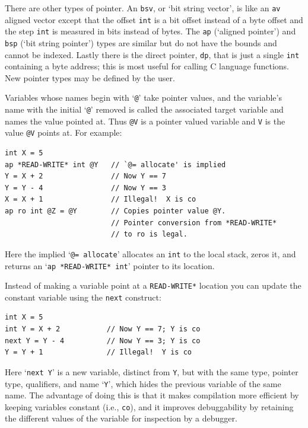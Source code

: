 \documentclass[12pt]{article}
\newenvironment{indpar}[1][0.3in]%
	{\begin{list}{}%
		     {\setlength{\itemsep}{0in}%
		      \setlength{\topsep}{0in}%
		      \setlength{\parsep}{1ex}%
		      \setlength{\labelwidth}{#1}%
		      \setlength{\leftmargin}{#1}%
		      \addtolength{\leftmargin}{\labelsep}}%
	 \item}%
	{\end{list}}
\begin{document}
There are other types of pointer.  An {\tt bsv}, or `bit string vector',
is like an {\tt av} aligned
vector except that the offset {\tt int} is a bit offset instead of
a byte offset and the step {\tt int} is measured in bits instead of bytes.
The {\tt ap} (`aligned pointer') and {\tt bsp} (`bit string pointer')
types are similar but do not have the bounds and cannot be indexed.  Lastly
there is the direct pointer, {\tt dp}, that is just a single {\tt int}
containing a byte address; this is most useful for calling
C language functions.
New pointer types may be defined by the user.

Variables whose names begin with `{\tt @}' take pointer values, and
the variable's name with the
initial `{\tt @}' removed is called the associated
target variable and names the value pointed at.
Thus {\tt @V} is a pointer valued variable and {\tt V} is the value
{\tt @V} points at.
For example:

\begin{indpar}\begin{verbatim}
int X = 5
ap *READ-WRITE* int @Y   // `@= allocate' is implied
Y = X + 2                // Now Y == 7
Y = Y - 4                // Now Y == 3
X = X + 1                // Illegal!  X is co
ap ro int @Z = @Y        // Copies pointer value @Y.
                         // Pointer conversion from *READ-WRITE*
                         // to ro is legal.
\end{verbatim}\end{indpar}

Here the implied `{\tt @= allocate}' allocates an {\tt int} to the local
stack, zeros it, and returns an `{\tt ap *READ-WRITE* int}'
pointer to its location.

Instead of making a variable point at a {\tt *READ-WRITE*} location you
can update the constant variable using the {\tt next} construct:
\begin{indpar}\begin{verbatim}
int X = 5
int Y = X + 2           // Now Y == 7; Y is co
next Y = Y - 4          // Now Y == 3; Y is co
Y = Y + 1               // Illegal!  Y is co
\end{verbatim}\end{indpar}
Here `{\tt next Y}' is a new variable, distinct from {\tt Y},
but with the same type, pointer type, qualifiers, and name `{\tt Y}',
which hides the previous variable of the same name.
The advantage of doing this is that it makes compilation more
efficient by keeping variables constant (i.e., {\tt co}), and
it improves debuggability by retaining the different values of
the variable for inspection by a debugger.
\end{document}
